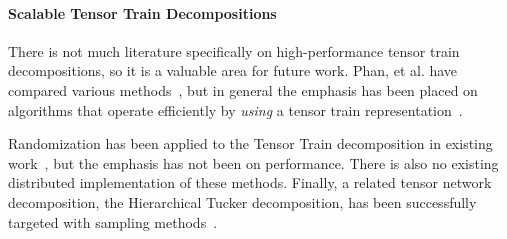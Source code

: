 \paragraph{Scalable Tensor Train Decompositions}
There is not much literature specifically on high-performance tensor train decompositions, so it is a valuable area for future work. Phan, et al. have compared various methods~\cite{Phan2016TensorNF}, but in general the emphasis has been placed on algorithms that operate efficiently by \emph{using} a tensor train representation~\cite{cichocki2}. 

Randomization has been applied to the Tensor Train decomposition in existing work~\cite{HSW17}, but the emphasis has not been on performance. There is also no existing distributed implementation of these methods. Finally, a related tensor network decomposition, the Hierarchical Tucker decomposition, has been successfully targeted with sampling methods~\cite{SHT}.
